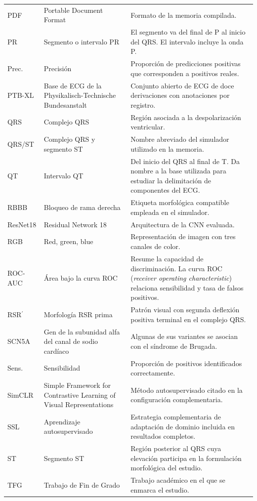 {\begin{longtable}{@{}>{\raggedright\arraybackslash}p{2.20cm}>{\raggedright\arraybackslash}p{4.10cm}>{\raggedright\arraybackslash}p{7.95cm}@{}}
PDF & Portable Document Format & Formato de la memoria compilada. \\
PR & Segmento o intervalo PR & El segmento va del final de P al inicio del QRS. El intervalo incluye la onda P. \\
Prec. & Precisión & Proporción de predicciones positivas que corresponden a positivos reales. \\
PTB-XL & Base de ECG de la Physikalisch-Technische Bundesanstalt & Conjunto abierto de ECG de doce derivaciones con anotaciones por registro. \\
QRS & Complejo QRS & Región asociada a la despolarización ventricular. \\
QRS/ST & Complejo QRS y segmento ST & Nombre abreviado del simulador utilizado en la memoria. \\
QT & Intervalo QT & Del inicio del QRS al final de T. Da nombre a la base utilizada para estudiar la delimitación de componentes del ECG. \\
RBBB & Bloqueo de rama derecha & Etiqueta morfológica compatible empleada en el simulador. \\
ResNet18 & Residual Network 18 & Arquitectura de la CNN evaluada. \\
RGB & Red, green, blue & Representación de imagen con tres canales de color. \\
ROC-AUC & Área bajo la curva ROC & Resume la capacidad de discriminación. La curva ROC (\textit{receiver operating characteristic}) relaciona sensibilidad y tasa de falsos positivos. \\
RSR$^\prime$ & Morfología RSR prima & Patrón visual con segunda deflexión positiva terminal en el complejo QRS. \\
SCN5A & Gen de la subunidad alfa del canal de sodio cardíaco & Algunas de sus variantes se asocian con el síndrome de Brugada. \\
Sens. & Sensibilidad & Proporción de positivos identificados correctamente. \\
SimCLR & Simple Framework for Contrastive Learning of Visual Representations & Método autosupervisado citado en la configuración complementaria. \\
SSL & Aprendizaje autosupervisado & Estrategia complementaria de adaptación de dominio incluida en resultados completos. \\
ST & Segmento ST & Región posterior al QRS cuya elevación participa en la formulación morfológica del estudio. \\
TFG & Trabajo de Fin de Grado & Trabajo académico en el que se enmarca el estudio. \\

\end{longtable}}
